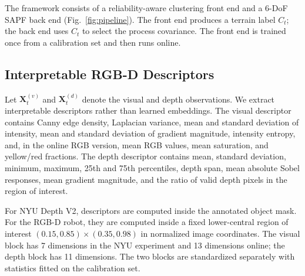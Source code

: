 \documentclass[final,3p,times]{elsarticle}
\begin{document}
The framework consists of a reliability-aware clustering front end and a 6-DoF SAPF back end (Fig.~\ref{fig:pipeline}). The front end produces a terrain label $C_t$; the back end uses $C_t$ to select the process covariance. The front end is trained once from a calibration set and then runs online.

\subsection{Interpretable RGB-D Descriptors}
\label{subsec:descriptors}
Let $\mathbf{X}^{(v)}_t$ and $\mathbf{X}^{(d)}_t$ denote the visual and depth observations. We extract interpretable descriptors rather than learned embeddings. The visual descriptor contains Canny edge density, Laplacian variance, mean and standard deviation of intensity, mean and standard deviation of gradient magnitude, intensity entropy, and, in the online RGB version, mean RGB values, mean saturation, and yellow/red fractions. The depth descriptor contains mean, standard deviation, minimum, maximum, 25th and 75th percentiles, depth span, mean absolute Sobel responses, mean gradient magnitude, and the ratio of valid depth pixels in the region of interest.

For NYU Depth V2, descriptors are computed inside the annotated object mask. For the RGB-D robot, they are computed inside a fixed lower-central region of interest $(0.15,0.85)\times(0.35,0.98)$ in normalized image coordinates. The visual block has 7 dimensions in the NYU experiment and 13 dimensions online; the depth block has 11 dimensions. The two blocks are standardized separately with statistics fitted on the calibration set.
\end{document}
